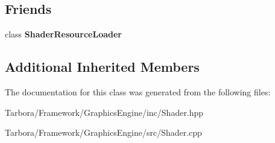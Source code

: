 \subsection*{Friends}
\begin{DoxyCompactItemize}
\item 
\mbox{\label{classTarbora_1_1Shader_af5dec6dcc9516c55d69a0f0503b73135}} 
class {\bfseries Shader\+Resource\+Loader}
\end{DoxyCompactItemize}
\subsection*{Additional Inherited Members}


The documentation for this class was generated from the following files\+:\begin{DoxyCompactItemize}
\item 
Tarbora/\+Framework/\+Graphics\+Engine/inc/Shader.\+hpp\item 
Tarbora/\+Framework/\+Graphics\+Engine/src/Shader.\+cpp\end{DoxyCompactItemize}
